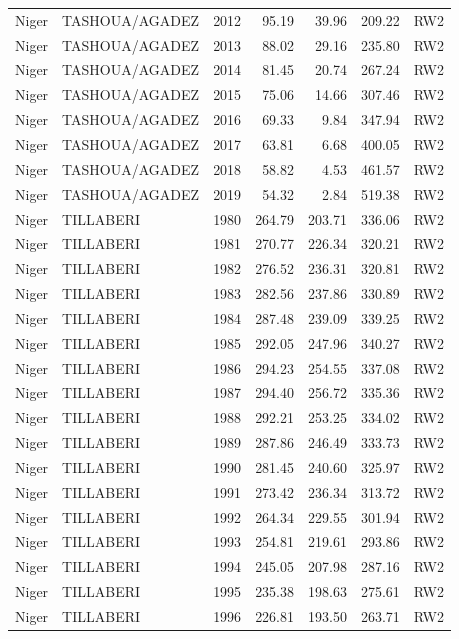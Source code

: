 \begin{longtable}{lllrrrl}
  Niger & TASHOUA/AGADEZ & 2012 & 95.19 & 39.96 & 209.22 & RW2 \\ 
  Niger & TASHOUA/AGADEZ & 2013 & 88.02 & 29.16 & 235.80 & RW2 \\ 
  Niger & TASHOUA/AGADEZ & 2014 & 81.45 & 20.74 & 267.24 & RW2 \\ 
  Niger & TASHOUA/AGADEZ & 2015 & 75.06 & 14.66 & 307.46 & RW2 \\ 
  Niger & TASHOUA/AGADEZ & 2016 & 69.33 & 9.84 & 347.94 & RW2 \\ 
  Niger & TASHOUA/AGADEZ & 2017 & 63.81 & 6.68 & 400.05 & RW2 \\ 
  Niger & TASHOUA/AGADEZ & 2018 & 58.82 & 4.53 & 461.57 & RW2 \\ 
  Niger & TASHOUA/AGADEZ & 2019 & 54.32 & 2.84 & 519.38 & RW2 \\ 
  Niger & TILLABERI & 1980 & 264.79 & 203.71 & 336.06 & RW2 \\ 
  Niger & TILLABERI & 1981 & 270.77 & 226.34 & 320.21 & RW2 \\ 
  Niger & TILLABERI & 1982 & 276.52 & 236.31 & 320.81 & RW2 \\ 
  Niger & TILLABERI & 1983 & 282.56 & 237.86 & 330.89 & RW2 \\ 
  Niger & TILLABERI & 1984 & 287.48 & 239.09 & 339.25 & RW2 \\ 
  Niger & TILLABERI & 1985 & 292.05 & 247.96 & 340.27 & RW2 \\ 
  Niger & TILLABERI & 1986 & 294.23 & 254.55 & 337.08 & RW2 \\ 
  Niger & TILLABERI & 1987 & 294.40 & 256.72 & 335.36 & RW2 \\ 
  Niger & TILLABERI & 1988 & 292.21 & 253.25 & 334.02 & RW2 \\ 
  Niger & TILLABERI & 1989 & 287.86 & 246.49 & 333.73 & RW2 \\ 
  Niger & TILLABERI & 1990 & 281.45 & 240.60 & 325.97 & RW2 \\ 
  Niger & TILLABERI & 1991 & 273.42 & 236.34 & 313.72 & RW2 \\ 
  Niger & TILLABERI & 1992 & 264.34 & 229.55 & 301.94 & RW2 \\ 
  Niger & TILLABERI & 1993 & 254.81 & 219.61 & 293.86 & RW2 \\ 
  Niger & TILLABERI & 1994 & 245.05 & 207.98 & 287.16 & RW2 \\ 
  Niger & TILLABERI & 1995 & 235.38 & 198.63 & 275.61 & RW2 \\ 
  Niger & TILLABERI & 1996 & 226.81 & 193.50 & 263.71 & RW2 \\ 

\end{longtable}
